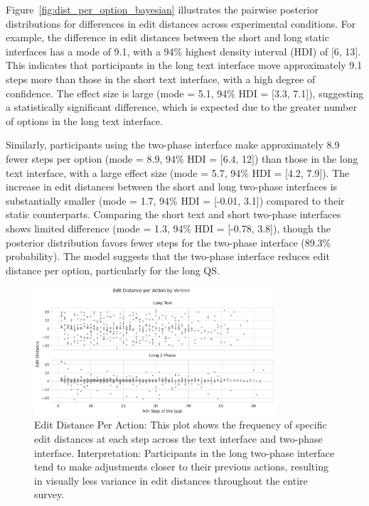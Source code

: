 Figure~\ref{fig:dist_per_option_bayesian} illustrates the pairwise posterior distributions for differences in edit distances across experimental conditions. For example, the difference in edit distances between the short and long static interfaces has a mode of 9.1, with a 94\% highest density interval (HDI) of [6, 13]. This indicates that participants in the long text interface move approximately 9.1 steps more than those in the short text interface, with a high degree of confidence. The effect size is large (mode = 5.1, 94\% HDI = [3.3, 7.1]), suggesting a statistically significant difference, which is expected due to the greater number of options in the long text interface.

Similarly, participants using the two-phase interface make approximately 8.9 fewer steps per option (mode = 8.9, 94\% HDI = [6.4, 12]) than those in the long text interface, with a large effect size (mode = 5.7, 94\% HDI = [4.2, 7.9]). The increase in edit distances between the short and long two-phase interfaces is substantially smaller (mode = 1.7, 94\% HDI = [-0.01, 3.1]) compared to their static counterparts. Comparing the short text and short two-phase interfaces shows limited difference (mode = 1.3, 94\% HDI = [-0.78, 3.8]), though the posterior distribution favors fewer steps for the two-phase interface (89.3\% probability). The model suggests that the two-phase interface reduces edit distance per option, particularly for the long QS.

\begin{figure}[h]
    \centering
    \includegraphics[width=0.8\textwidth]{content/image/distance/edit_distance_per_action_by_version.pdf}
    \caption{Edit Distance Per Action: This plot shows the frequency of specific edit distances at each step across the text interface and two-phase interface. Interpretation: Participants in the long two-phase interface tend to make adjustments closer to their previous actions, resulting in visually less variance in edit distances throughout the entire survey.}
    \label{fig:step-over-distance}
\end{figure}

